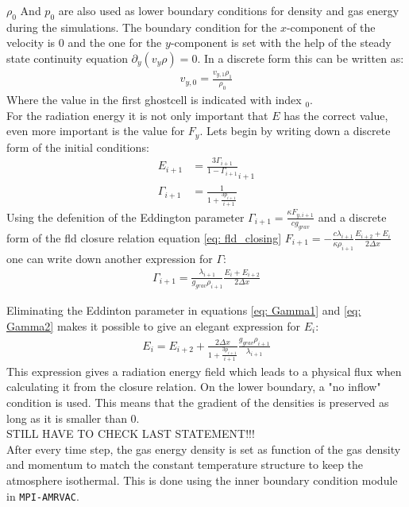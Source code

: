 $\rho_0$ And $p_0$ are also used as lower boundary conditions for density and gas energy during the simulations. The  boundary condition for the $x$-component of the velocity is $0$ and the one for the $y$-component is set with the help of the steady state continuity equation $\partial_y(v_y \rho) = 0$. In a discrete form this can be written as:
\begin{align}
v_{y,0} = \frac{v_{y,1} \rho_1}{\rho_0}
\end{align}
Where the value in the first ghostcell is indicated with index $_0$.\\
For the radiation energy it is not only important that $E$ has the correct value, even more important is the value for $F_y$. Lets begin by writing down a discrete form of the initial conditions:
\begin{align}
E_{i+1} &= \frac{3 \Gamma_{i+1}}{1-\Gamma_{i+1}}_{i+1} \\
\Gamma_{i+1} &= \frac{1}{1 + \frac{3 p_{i+1}}{i+1}} \label{eq: Gamma1}
\end{align}
Using the defenition of the Eddington parameter $\Gamma_{i+1} = \frac{\kappa F_{y,i+1}}{c g_{grav}}$ and a discrete form of the fld closure relation equation \eqref{eq: fld_closing} $F_{i+1} = -\frac{c \lambda_{i+1}}{\kappa \rho_{i+1}} \frac{E_{i+2} + E_{i}}{2 \Delta x}$ one can write down another expression for $\Gamma$:
\begin{align}
\Gamma_{i+1} = \frac{\lambda_{i+1}}{g_{grav}\rho_{i+1}}\frac{E_i + E_{i+2}}{2 \Delta x} \label{eq: Gamma2}
\end{align}

Eliminating the Eddinton parameter in equations \ref{eq: Gamma1} and \eqref{eq: Gamma2} makes it possible to give an elegant expression for $E_i$:
\begin{align}
E_i = E_{i+2} + \frac{2 \Delta x}{1 + \frac{3 p_{i+1}}{i+1}}  \frac{g_{grav} \rho_{i+1}}{\lambda_{i+1}}  
\end{align}
This expression gives a radiation energy field which leads to a physical flux when calculating it from the closure relation. On the lower boundary, a "no inflow" condition is used. This means that the gradient of the densities is preserved as long as it is smaller than $0$.\\ STILL HAVE TO CHECK LAST STATEMENT!!!\\

After every time step, the gas energy density is set as function of the gas density and momentum to match the constant temperature structure to keep the atmosphere isothermal. This is done using the inner boundary condition module in \texttt{MPI-AMRVAC}.\\


